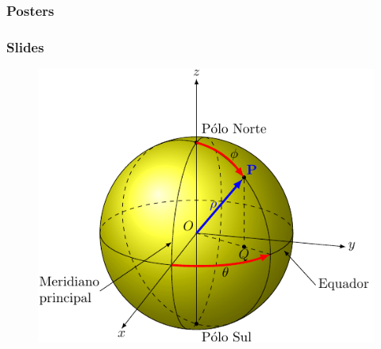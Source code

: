 \documentclass{beamer}
\begin{document}
{%

  \begin{frame}\frametitle{Posters}
  \end{frame}
}

\begin{frame}\frametitle{Slides}
  \begin{figure}[h]
    \centering
    \includegraphics[height=0.6\paperheight]{img/slides}
  \end{figure}
\end{frame}
\end{document}
